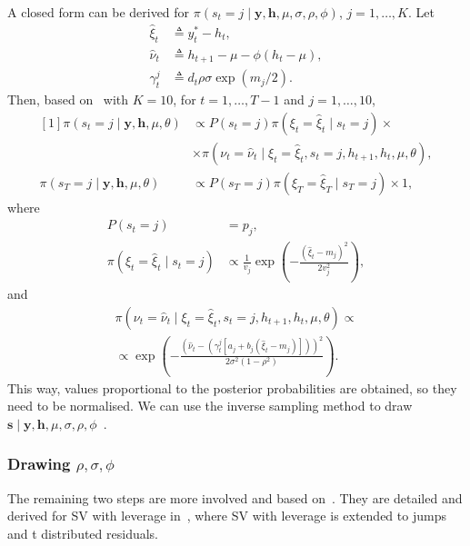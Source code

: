 A closed form can be derived for $\pi(s_t=j\mid\bm{y},\bm{h},\mu,\sigma,\rho,\phi)$, $j=1,\dots,K$.
Let
\begin{align*}
\hat\xi_t &\triangleq y_t^\ast-h_t, \\
\hat{\nu}_t &\triangleq h_{t+1}-\mu-\phi(h_t-\mu), \\
\gamma_t^j &\triangleq d_t\rho\sigma\exp(m_j/2).
\end{align*}
Then, based on~\citet{Omori2007} with $K=10$, for $t=1,\dots,T-1$ and $j=1,\dots,10$,
\begin{equation}
\begin{aligned}[1]
\pi\left(s_t=j\mid\bm{y},\bm{h},\mu,\theta\right) &\propto P\left(s_t=j\right)\pi\left(\xi_t=\hat\xi_t\mid s_t=j\right)\times \\
&\times\pi\left(\nu_t=\hat\nu_t\mid\xi_t=\hat\xi_t,s_t=j,h_{t+1},h_t,\mu,\theta\right), \\
\pi\left(s_T=j\mid\bm{y},\bm{h},\mu,\theta\right)
&\propto P\left(s_T=j\right)\pi\left(\xi_T=\hat\xi_T\mid s_T=j\right)\times 1,
\end{aligned}
\end{equation}
where
\begin{align*}
P\left(s_t=j\right) &= p_j, \\
\pi\left(\xi_t=\hat\xi_t\mid s_t=j\right) &\propto \frac{1}{v_j}\exp\left(-\frac{\left(\hat\xi_t-m_j\right)^2}{2v_j^2}\right),
\end{align*}
and
\begin{multline*}
\pi\left(\nu_t=\hat\nu_t\mid\xi_t=\hat\xi_t,s_t=j,h_{t+1},h_t,\mu,\theta\right) \propto \\
\propto \exp\left(-\frac{\left(\hat{\nu}_t-\left(\gamma_t^j\left[a_j+b_j\left(\hat\xi_t-m_j\right)\right]\right)\right)^2}{2\sigma^2\left(1-\rho^2\right)}\right).
\end{multline*}
This way, values proportional to the posterior probabilities are obtained, so they need to be normalised.
We can use the inverse sampling method to draw $\bm s\mid\bm{y},\bm{h},\mu,\sigma,\rho,\phi$~\citep{grinstead2012introduction}.

\subsubsection{Drawing $\rho,\sigma,\phi$}

The remaining two steps are more involved and based on~\citet{de1995simulation}.
They are detailed and derived for SV with leverage in~\citet{Nakajima2009}, where SV with leverage is extended to jumps and t distributed residuals.

